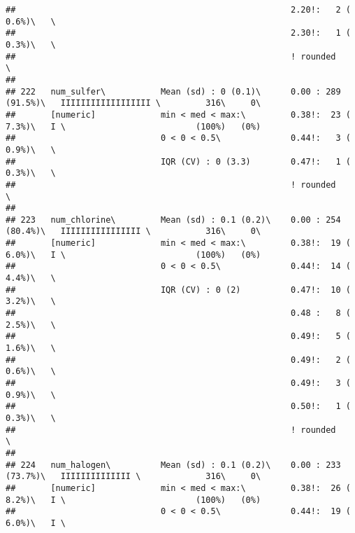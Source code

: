 \documentclass[]{article}
\begin{document}
\begin{verbatim}
##                                                       2.20!:   2 ( 0.6%)\   \                                              
##                                                       2.30!:   1 ( 0.3%)\   \                                              
##                                                       ! rounded             \                                              
## 
## 222   num_sulfer\           Mean (sd) : 0 (0.1)\      0.00 : 289 (91.5%)\   IIIIIIIIIIIIIIIIII \         316\     0\       
##       [numeric]             min < med < max:\         0.38!:  23 ( 7.3%)\   I \                          (100%)   (0%)     
##                             0 < 0 < 0.5\              0.44!:   3 ( 0.9%)\   \                                              
##                             IQR (CV) : 0 (3.3)        0.47!:   1 ( 0.3%)\   \                                              
##                                                       ! rounded             \                                              
## 
## 223   num_chlorine\         Mean (sd) : 0.1 (0.2)\    0.00 : 254 (80.4%)\   IIIIIIIIIIIIIIII \           316\     0\       
##       [numeric]             min < med < max:\         0.38!:  19 ( 6.0%)\   I \                          (100%)   (0%)     
##                             0 < 0 < 0.5\              0.44!:  14 ( 4.4%)\   \                                              
##                             IQR (CV) : 0 (2)          0.47!:  10 ( 3.2%)\   \                                              
##                                                       0.48 :   8 ( 2.5%)\   \                                              
##                                                       0.49!:   5 ( 1.6%)\   \                                              
##                                                       0.49!:   2 ( 0.6%)\   \                                              
##                                                       0.49!:   3 ( 0.9%)\   \                                              
##                                                       0.50!:   1 ( 0.3%)\   \                                              
##                                                       ! rounded             \                                              
## 
## 224   num_halogen\          Mean (sd) : 0.1 (0.2)\    0.00 : 233 (73.7%)\   IIIIIIIIIIIIII \             316\     0\       
##       [numeric]             min < med < max:\         0.38!:  26 ( 8.2%)\   I \                          (100%)   (0%)     
##                             0 < 0 < 0.5\              0.44!:  19 ( 6.0%)\   I \                                            

\end{verbatim}
\end{document}
